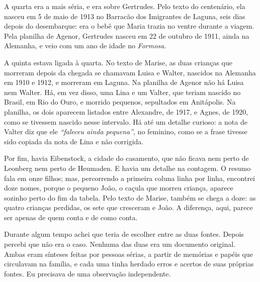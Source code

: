 \documentclass[
  brazilian,
  11pt,
  openany]{book}
\begin{document}
A quarta era a mais séria, e era sobre Gertrudes. Pelo texto do
centenário, ela nasceu em 5 de maio de 1913 no Barracão dos Imigrantes
de Laguna, seis dias depois do desembarque: era o bebê que Maria trazia
no ventre durante a viagem. Pela planilha de Agenor, Gertrudes nasceu em
22 de outubro de 1911, ainda na Alemanha, e veio com um ano de idade no
\emph{Formosa}.

A quinta estava ligada à quarta. No texto de Marise, as duas crianças
que morreram depois da chegada se chamavam Luisa e Walter, nascidos na
Alemanha em 1910 e 1912, e morreram em Laguna. Na planilha de Agenor não
há Luisa nem Walter. Há, em vez disso, uma Lina e um Valter, que teriam
nascido no Brasil, em Rio do Ouro, e morrido pequenos, sepultados em
Anitápolis. Na planilha, os dois aparecem listados entre Alexandre, de
1917, e Agnes, de 1920, como se tivessem nascido nesse intervalo. Há até
um detalhe curioso: a nota de Valter diz que ele \emph{``faleceu ainda
pequena''}, no feminino, como se a frase tivesse sido copiada da nota de
Lina e não corrigida.

Por fim, havia Eibenstock, a cidade do casamento, que não ficava nem
perto de Leonberg nem perto de Heumaden. E havia um detalhe na contagem.
O resumo fala em onze filhos; mas, percorrendo a primeira coluna linha
por linha, encontrei doze nomes, porque o pequeno João, o caçula que
morreu criança, aparece sozinho perto do fim da tabela. Pelo texto de
Marise, também se chega a doze: as quatro crianças perdidas, os sete que
cresceram e João. A diferença, aqui, parece ser apenas de quem conta e
de como conta.

Durante algum tempo achei que teria de escolher entre as duas fontes.
Depois percebi que não era o caso. Nenhuma das duas era um documento
original. Ambas eram sínteses feitas por pessoas sérias, a partir de
memórias e papéis que circulavam na família, e cada uma tinha herdado
erros e acertos de suas próprias fontes. Eu precisava de uma observação
independente.
\end{document}
